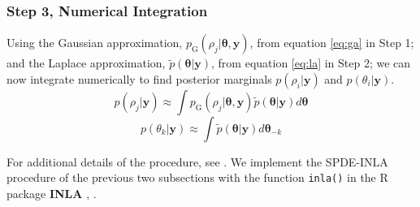 \subsubsection{Step 3, Numerical Integration} %
Using the Gaussian approximation, $p_{\text{G}}(\rho_{j}|\pmb{\theta, y})$, from equation \ref{eq:ga} in Step 1; and the Laplace approximation, $\tilde{p}(\pmb{\theta}|\pmb{y})$, from equation \ref{eq:la} in Step 2; we can now integrate numerically to find posterior marginals $p(\rho_{i}|\pmb{y})$ and $p(\theta_{i}|\pmb{y})$. 
        $$ p(\rho_{j} | \pmb{y}) \approx \int p_{\text{G}}(\rho_{j}|\pmb{\theta, y})\tilde{p}(\pmb{\theta}|\pmb{y}) d\pmb{\theta} $$
        $$ p(\theta_{k} | \pmb{y}) \approx \int \tilde{p}(\pmb{\theta}|\pmb{y}) d\pmb{\theta}_{-k} $$
        
For additional details of the procedure, see \cite{Rue2009}. We implement the SPDE-INLA procedure of the previous two subsections with the function \verb|inla()| in the R package {\bf INLA} \citep{INLA}, \citep{Lindgren2015}.
        
